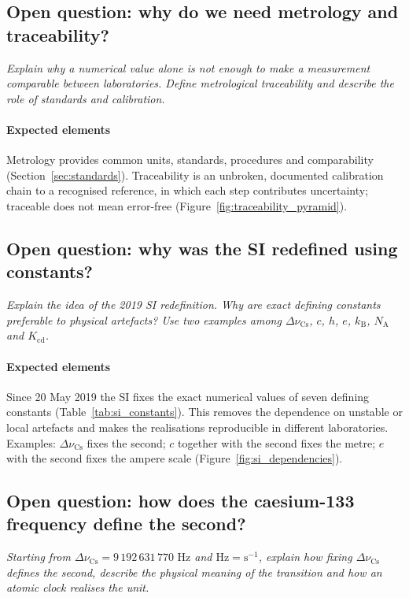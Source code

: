 \subsection{Open question: why do we need metrology and traceability?}

\emph{Explain why a numerical value alone is not enough to make a measurement comparable between laboratories. Define metrological traceability and describe the role of standards and calibration.}

\paragraph{Expected elements} Metrology provides common units, standards, procedures and comparability (Section~\ref{sec:standards}). Traceability is an unbroken, documented calibration chain to a recognised reference, in which each step contributes uncertainty; traceable does not mean error-free (Figure~\ref{fig:traceability_pyramid}).

\subsection{Open question: why was the SI redefined using constants?}

\emph{Explain the idea of the 2019 SI redefinition. Why are exact defining constants preferable to physical artefacts? Use two examples among $\Delta\nu_{\text{Cs}}$, $c$, $h$, $e$, $k_{\text{B}}$, $N_{\text{A}}$ and $K_{\text{cd}}$.}

\paragraph{Expected elements} Since 20 May 2019 the SI fixes the exact numerical values of seven defining constants (Table~\ref{tab:si_constants}). This removes the dependence on unstable or local artefacts and makes the realisations reproducible in different laboratories. Examples: $\Delta\nu_{\text{Cs}}$ fixes the second; $c$ together with the second fixes the metre; $e$ with the second fixes the ampere scale (Figure~\ref{fig:si_dependencies}).

\subsection{Open question: how does the caesium-133 frequency define the second?}

\emph{Starting from $\Delta\nu_{\text{Cs}} = 9\,192\,631\,770\text{ Hz}$ and $\text{Hz} = \text{s}^{-1}$, explain how fixing $\Delta\nu_{\text{Cs}}$ defines the second, describe the physical meaning of the transition and how an atomic clock realises the unit.}

